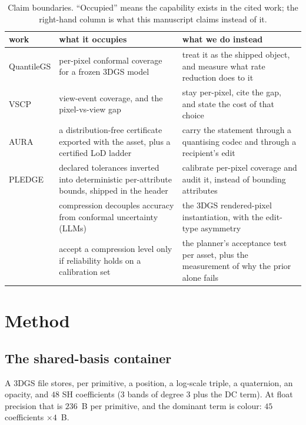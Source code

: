 \documentclass[preprint,number,3p]{elsarticle}
\begin{document}
\begin{table}[t]
\centering
\small
\setlength{\tabcolsep}{3.2pt}
\caption{Claim boundaries. ``Occupied'' means the capability exists in the cited work; the right-hand column is what
this manuscript claims instead of it.}
\label{tab:claims}
\begin{tabular}{p{2.0cm}p{4.3cm}p{6.0cm}}
\toprule
work & what it occupies & what we do instead \\
\midrule
QuantileGS \cite{quantilegs} & per-pixel conformal coverage for a frozen 3DGS model & treat it as the shipped object,
and measure what rate reduction does to it \\
VSCP \cite{vscp} & view-event coverage, and the pixel-vs-view gap & stay per-pixel, cite the gap, and state the cost
of that choice \\
AURA \cite{aura} & a distribution-free certificate exported with the asset, plus a certified LoD ladder & carry the
statement through a quantising codec and through a recipient's edit \\
PLEDGE \cite{pledge} & declared tolerances inverted into deterministic per-attribute bounds, shipped in the header &
calibrate per-pixel coverage and audit it, instead of bounding attributes \\
\cite{compuncertainty} & compression decouples accuracy from conformal uncertainty (LLMs) & the 3DGS rendered-pixel
instantiation, with the edit-type asymmetry \\
\cite{sgavmp} & accept a compression level only if reliability holds on a calibration set & the planner's acceptance
test per asset, plus the measurement of why the prior alone fails \\
\bottomrule
\end{tabular}
\end{table}

\section{Method}
\label{sec:method}

\subsection{The shared-basis container}
\label{sec:container}

A 3DGS file stores, per primitive, a position, a log-scale triple, a quaternion, an opacity, and $48$ SH
coefficients ($3$ bands of degree $3$ plus the DC term). At float precision that is $236$~B per primitive, and the
dominant term is colour: $45$ coefficients $\times 4$~B.
\end{document}
